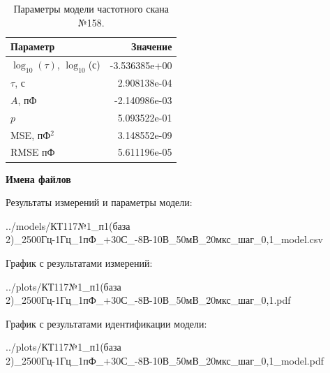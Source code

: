 \begin{table}[!ht]
    \centering
    \caption{Параметры модели частотного скана №158.}
    \begin{tabular}{|l|r|}
        \hline
        Параметр                                       & Значение                  \\ \hline
        $\log_{10}(\tau)$, $\log_{10}$(с)              & -3.536385e+00             \\ \hline
        $\tau$, с                                      & 2.908138e-04              \\ \hline
        $A$, пФ                                        & -2.140986e-03             \\ \hline
        $p$                                            & 5.093522e-01              \\ \hline
        MSE, пФ$^2$                                    & 3.148552e-09              \\ \hline
        RMSE пФ                                        & 5.611196e-05              \\ \hline
    \end{tabular}
    \label{table:frequency_scan_model_158}
\end{table}

\textbf{Имена файлов}

Результаты измерений и параметры модели:

\scriptsize../models/КТ117№1\_п1(база 2)\_2500Гц-1Гц\_1пФ\_+30С\_-8В-10В\_50мВ\_20мкс\_шаг\_0,1\_model.csv
\normalsize

График с результатами измерений:

\scriptsize../plots/КТ117№1\_п1(база 2)\_2500Гц-1Гц\_1пФ\_+30С\_-8В-10В\_50мВ\_20мкс\_шаг\_0,1.pdf
\normalsize

График с результатами идентификации модели:

\scriptsize../plots/КТ117№1\_п1(база 2)\_2500Гц-1Гц\_1пФ\_+30С\_-8В-10В\_50мВ\_20мкс\_шаг\_0,1\_model.pdf
\normalsize

